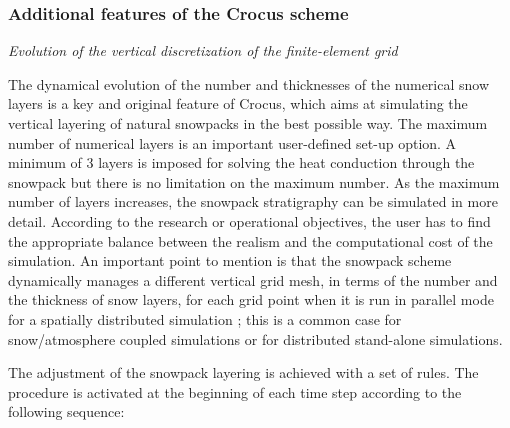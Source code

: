 \subsubsection{Additional features of the Crocus scheme}

{\it Evolution of the vertical discretization of the finite-element grid}

The dynamical evolution of the number and thicknesses of the numerical
snow layers is a key and original feature of Crocus, which aims at
simulating  the vertical layering of natural snowpacks in the best
possible way. The maximum number of numerical layers is an important
user-defined set-up option. A minimum of 3 layers is imposed for
solving the heat conduction through the snowpack but there is no
limitation on the maximum number. As the maximum number of layers
increases, the snowpack stratigraphy can be simulated in more
detail. According to the research or operational objectives, the user
has to find the appropriate balance between the realism and the
computational cost of the simulation. An important point to mention is
that the snowpack scheme dynamically manages a different vertical grid
mesh, in terms of the number and the thickness of snow layers, for
each grid point when it is run in parallel mode for a spatially
distributed simulation ; this is a common case for snow/atmosphere
coupled simulations or for distributed stand-alone simulations. 


The adjustment of the snowpack layering is achieved with a set of
rules. The procedure is activated at the beginning of each time step
according to the following sequence:

